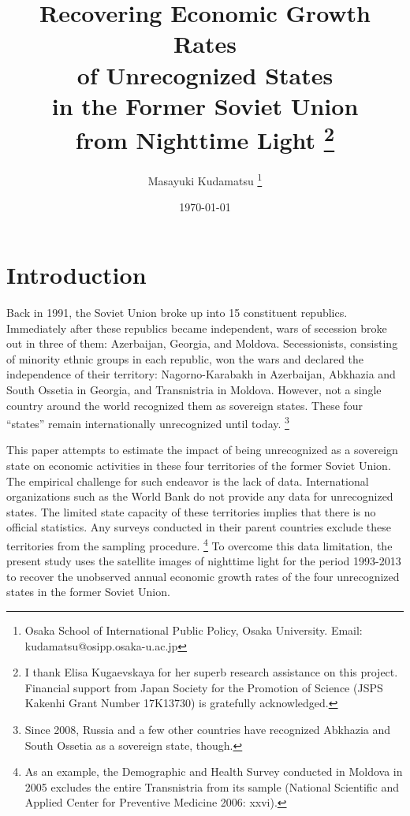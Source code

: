 \documentclass[12pt,a4paper]{article}%
\begin{document}
\title{Recovering Economic Growth Rates \\ of Unrecognized States \\ in the Former Soviet Union \\ from Nighttime Light \thanks{I thank Elisa Kugaevskaya for her superb research assistance on this project. Financial support from Japan Society for the Promotion of Science (JSPS Kakenhi Grant Number 17K13730) is gratefully acknowledged.} }
\author{Masayuki Kudamatsu \thanks{Osaka School of International Public Policy, Osaka University. Email: kudamatsu@osipp.osaka-u.ac.jp}}
\date{\today}
\maketitle

\section{Introduction}
Back in 1991, the Soviet Union broke up into 15 constituent republics. Immediately after these republics became independent, wars of secession broke out in three of them: Azerbaijan, Georgia, and Moldova. Secessionists, consisting of minority ethnic groups in each republic, won the wars and declared the independence of their territory: Nagorno-Karabakh in Azerbaijan, Abkhazia and South Ossetia in Georgia, and Transnistria in Moldova. However, not a single country around the world recognized them as sovereign states. These four ``states'' remain internationally unrecognized until today.%
\footnote{%
	Since 2008, Russia and a few other countries have recognized Abkhazia and South Ossetia as a sovereign state, though.
} 

This paper attempts to estimate the impact of being unrecognized as a sovereign state on economic activities in these four territories of the former Soviet Union. The empirical challenge for such endeavor is the lack of data. International organizations such as the World Bank do not provide any data for unrecognized states. The limited state capacity of these territories implies that there is no official statistics. Any surveys conducted in their parent countries exclude these territories from the sampling procedure.%
\footnote{%
	As an example, the Demographic and Health Survey conducted in Moldova in 2005 excludes the entire Transnistria from its sample (National Scientific and Applied Center for Preventive Medicine 2006: xxvi).
} 
To overcome this data limitation, the present study uses the satellite images of nighttime light for the period 1993-2013 to recover the unobserved annual economic growth rates of the four unrecognized states in the former Soviet Union.
\end{document}
